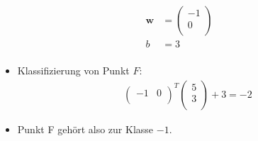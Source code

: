 \begin{frame}
\begin{figure}[h]
\begin{minipage}{0.4\textwidth}
\begin{itemize}
\begin{align*}
                        \boldsymbol{w} &= \left( \begin{matrix}
                            -1 \\
                            0 \\
                        \end{matrix} \right) \\
                        b &= 3 \\ 
                    \end{align*}
            \end{itemize} 
        \end{minipage}
    \end{figure}

    \begin{itemize}
        \item<1-> Klassifizierung von Punkt $F$:
            \begin{align*}
                \left( \begin{matrix}
                    -1 & 0 \\
                \end{matrix} \right)^T \left( \begin{matrix}
                    5 \\
                    3 \\
                \end{matrix} \right) + 3 = -2
            \end{align*}
        \item<1-> Punkt F gehört also zur Klasse $-1$.
    \end{itemize}
\end{frame}

